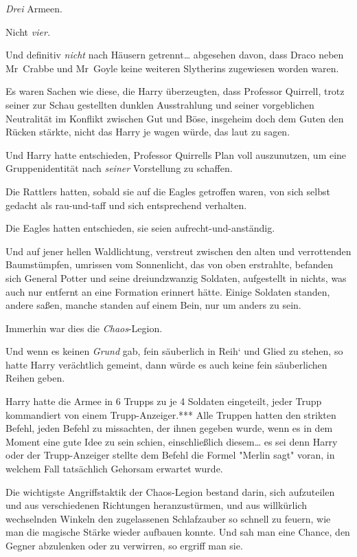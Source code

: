 {\emph{Drei} Armeen.

Nicht \emph{vier.}

Und definitiv \emph{nicht} nach Häusern getrennt… abgesehen davon, dass Draco neben Mr~Crabbe und Mr~Goyle keine weiteren Slytherins zugewiesen worden waren.

Es waren Sachen wie diese, die Harry überzeugten, dass Professor Quirrell, trotz seiner zur Schau gestellten dunklen Ausstrahlung und seiner vorgeblichen Neutralität im Konflikt zwischen Gut und Böse, insgeheim doch dem Guten den Rücken stärkte, nicht das Harry je wagen würde, das laut zu sagen.

Und Harry hatte entschieden, Professor Quirrells Plan voll auszunutzen, um eine Gruppenidentität nach \emph{seiner} Vorstellung zu schaffen.

Die Rattlers hatten, sobald sie auf die Eagles getroffen waren, von sich selbst gedacht als rau-und-taff und sich entsprechend verhalten.

Die Eagles hatten entschieden, sie seien aufrecht-und-anständig.

Und auf jener hellen Waldlichtung, verstreut zwischen den alten und verrottenden Baumstümpfen, umrissen vom Sonnenlicht, das von oben erstrahlte, befanden sich General Potter und seine dreiundzwanzig Soldaten, aufgestellt in nichts, was auch nur entfernt an eine Formation erinnert hätte. Einige Soldaten standen, andere saßen, manche standen auf einem Bein, nur um anders zu sein.

Immerhin war dies die \emph{Chaos}-Legion.

Und wenn es keinen \emph{Grund} gab, fein säuberlich in Reih` und Glied zu stehen, so hatte Harry verächtlich gemeint, dann würde es auch keine fein säuberlichen Reihen geben.

Harry hatte die Armee in 6 Trupps zu je 4 Soldaten eingeteilt, jeder Trupp kommandiert von einem Trupp-Anzeiger.*** Alle Truppen hatten den strikten Befehl, jeden Befehl zu missachten, der ihnen gegeben wurde, wenn es in dem Moment eine gute Idee zu sein schien, einschließlich diesem… es sei denn Harry oder der Trupp-Anzeiger stellte dem Befehl die Formel "Merlin sagt" voran, in welchem Fall tatsächlich Gehorsam erwartet wurde.

Die wichtigste Angriffstaktik der Chaos-Legion bestand darin, sich aufzuteilen und aus verschiedenen Richtungen heranzustürmen, und aus willkürlich wechselnden Winkeln den zugelassenen Schlafzauber so schnell zu feuern, wie man die magische Stärke wieder aufbauen konnte. Und sah man eine Chance, den Gegner abzulenken oder zu verwirren, so ergriff man sie.

}
